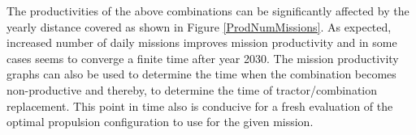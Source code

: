 \documentclass[ExampleMasters.tex]{subfiles}
\begin{document}
	
	The productivities of the above combinations can be significantly affected by the yearly distance covered as shown in Figure \ref{ProdNumMissions}. As expected, increased number of daily missions improves mission productivity and in some cases seems to converge a finite time after year 2030. The mission productivity graphs can also be used to determine the time when the combination becomes non-productive and thereby, to determine the time of tractor/combination replacement. This point in time also is conducive for a fresh evaluation of the optimal propulsion configuration to use for the given mission.\\

	\newpage
\end{document}
